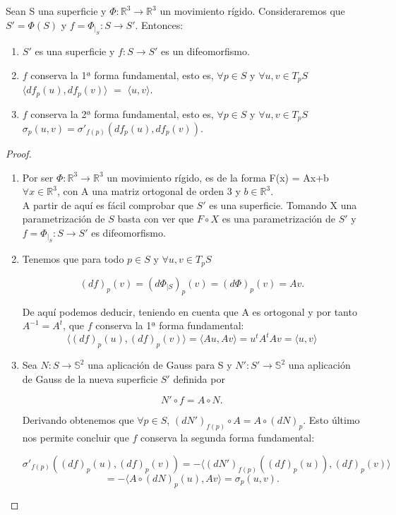 \begin{proposicion}\label{prop:rig1} %
	Sean S una superficie y  $\Phi : \mathbb{R}^3 \to \mathbb{R}^3$  un movimiento rígido. Consideraremos que $S' = \Phi(S)$ y $f = \Phi_{\mid_{S}} : S \to S'$. Entonces:
	\begin{enumerate}
		\item $S'$ es una superficie y $f : S \to S'$ es un difeomorfismo.
		\item $f$ conserva la 1ª forma fundamental, esto es, $\forall p \in S$ y $\forall u,v \in T_p S$ $\langle df_p(u), df_p(v) \rangle $ $=$ $ \langle u, v \rangle$.
		\item $f$ conserva la 2ª forma fundamental, esto es, $\forall p \in S$ y $\forall u,v \in T_p S$ $\sigma_p(u,v) = \sigma'_{f(p)}(df_p(u), df_p(v))$.
	\end{enumerate}
\end{proposicion}

\begin{proof}
	${ }$%
	\begin{enumerate}
		\item Por ser $ \Phi : \mathbb{R}^3 \to \mathbb{R}^3 $ un movimiento rígido, es de la forma F(x) = Ax+b $\forall x \in \mathbb{R}^3$, con A una matriz ortogonal de orden 3 y $b \in \mathbb{R}^3$.
		${ }$\\
		A partir de aquí es fácil comprobar que $S'$ es una superficie. Tomando X una parametrización de $S$ basta con ver que $F\circ X$ es una parametrización de $S'$ y $f = \Phi_{\mid_{S}} : S \to S'$ es difeomorfismo.
		${ }$\\
		
		\item Tenemos que para todo $p \in S$ y $\forall u, v \in T_p S$
		
		\[
		(df)_p(v) = (d\Phi_{\mid S})_p(v) = (d\Phi)_p(v) = Av.
		\]
		
		De aquí podemos deducir, teniendo en cuenta que A es ortogonal y por tanto $A^{-1} = A^t$, que $f$ conserva la 1ª forma fundamental:
		\[
		\langle (df)_p(u), (df)_p(v) \rangle = \langle Au, Av \rangle = u^tA^tAv = \langle u, v \rangle
		\]
		
		\item Sea $N : S \to \mathbb{S}^2$ una aplicación de Gauss para S y $N' : S' \to \mathbb{S}^2$ una aplicación de Gauss de la nueva superficie $S'$ definida por
		
		\[
		N'\circ f = A\circ N.
		\]
		
		Derivando obtenemos que $\forall p \in S$,  $(dN')_{f(p)}\circ A = A \circ (dN)_p$. Esto último nos permite concluir que $f$ conserva la segunda forma fundamental:
		
		\[
		\sigma'_{f(p)}((df)_p(u), (df)_p(v)) = - \langle (dN')_{f(p)}((df)_p(u)), (df)_p(v) \rangle
		\]
		\[
		= - \langle A\circ(dN)_p(u), Av \rangle = \sigma_p(u, v).
		\]
	\end{enumerate}
\end{proof}
${ }$\\

